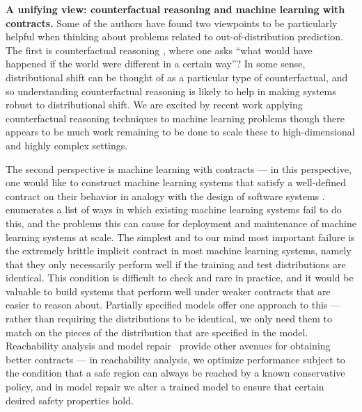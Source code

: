 \documentclass[a4paper,10pt]{article}
\begin{document}
{\bf A unifying view: counterfactual reasoning and machine learning with contracts.} Some of the authors have found two viewpoints to be particularly helpful when thinking about problems related to out-of-distribution prediction. The first is counterfactual reasoning \cite{neyman1923applications,rubin1974estimating,pearl2009causal,bottou2013counterfactual}, where one asks ``what would have happened if the world were different in a certain way”? In some sense, distributional shift can be thought of as a particular type of counterfactual, and so understanding counterfactual reasoning is likely to help in making systems robust to distributional shift. We are excited by recent work applying counterfactual reasoning techniques to machine learning problems  \cite{bottou2013counterfactual,peters2014causal,swaminathan2015counterfactual,wager2015estimation,johansson2016learning,shalit2016bounding} though there appears to be much work remaining to be done to scale these to high-dimensional and highly complex settings.

The second perspective is machine learning with contracts --- in this perspective, one would like to construct machine learning systems that satisfy a well-defined contract on their behavior in analogy with the design of software systems \cite{sculley2014machine,bottou2015,liang2015elusive}. \cite{sculley2014machine} enumerates a list of ways in which existing machine learning systems fail to do this, and the problems this can cause for deployment and maintenance of machine learning systems at scale. The simplest and to our mind most important failure is the extremely brittle implicit contract in most machine learning systems, namely that they only necessarily perform well if the training and test distributions are identical. This condition is difficult to check and rare in practice, and it would be valuable to build systems that perform well under weaker contracts that are easier to reason about. Partially specified models offer one approach to this --- rather than requiring the distributions to be identical, we only need them to match on the pieces of the distribution that are specified in the model. Reachability analysis \cite{lygeros1999controllers,mitchell2005time} and model repair~\cite{ghosh2016trusted} provide other avenues for obtaining better contracts --- in reachability analysis, we optimize performance subject to the condition that a safe region can always be reached by a known conservative policy, and in model repair we alter a trained model to ensure that certain desired safety properties hold.
\end{document}
